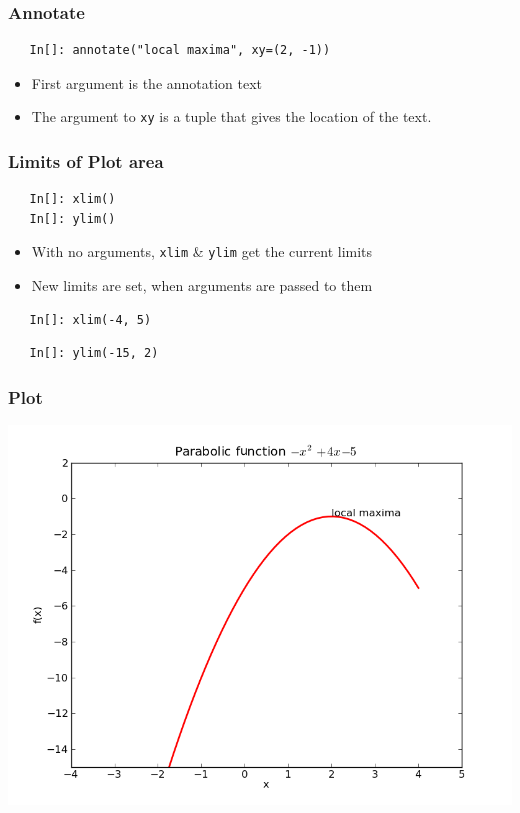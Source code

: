 \begin{frame}[fragile]
  \frametitle{Annotate}
  \begin{lstlisting}
   In[]: annotate("local maxima", xy=(2, -1))
  \end{lstlisting}
  \begin{itemize}
  \item First argument is the annotation text
  \item The argument to \texttt{xy} is a tuple that gives the location
    of the text. 
  \end{itemize}
\end{frame}

\begin{frame}[fragile]
  \frametitle{Limits of Plot area}
  \begin{lstlisting}
   In[]: xlim()
   In[]: ylim()
  \end{lstlisting}
  \begin{itemize}
  \item With no arguments, \texttt{xlim} \& \texttt{ylim} get the
    current limits
  \item New limits are set, when arguments are passed to them
  \end{itemize}
  \begin{lstlisting}
   In[]: xlim(-4, 5)
  \end{lstlisting}
  \begin{lstlisting}
   In[]: ylim(-15, 2)
  \end{lstlisting}
\end{frame}

\begin{frame}
\frametitle{Plot}
\includegraphics[scale=0.45]{../advanced_python/images/plot.png}\\
\end{frame}



